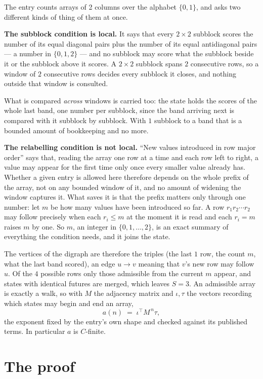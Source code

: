 \documentclass[11pt,a4paper]{article}
\theoremstyle{plain}
\theoremstyle{definition}
\begin{document}
The entry counts arrays of 2 columns over the alphabet $\{0,1\}$, and asks two different kinds of thing of them at once.

\textbf{The subblock condition is local.} It says that every $2\times2$ subblock scores the number of its equal diagonal pairs plus the number of its equal antidiagonal pairs --- a number in $\{0,1,2\}$ --- and no subblock may score what the subblock beside it or the subblock above it scores. A $ 2\times2$ subblock spans $2$ consecutive rows, so a window of $2$ consecutive rows decides every subblock it closes, and nothing outside that window is consulted.

What is compared \emph{across} windows is carried too: the state holds the scores of the whole last band, one number per subblock, since the band arriving next is compared with it subblock by subblock. With $1$ subblock to a band that is a bounded amount of bookkeeping and no more.

\textbf{The relabelling condition is not local.} ``New values introduced in row major order'' says that, reading the array one row at a time and each row left to right, a value may appear for the first time only once every smaller value already has. Whether a given entry is allowed here therefore depends on the whole prefix of the array, not on any bounded window of it, and no amount of widening the window captures it. What saves it is that the prefix matters only through one number: let $m$ be how many values have been introduced so far. A row $r_1r_2\cdots r_2$ may follow precisely when each $r_i\le m$ at the moment it is read and each $r_i=m$ raises $m$ by one. So $m$, an integer in $\{0,1,\dots,2\}$, is an exact summary of everything the condition needs, and it joins the state.

The vertices of the digraph are therefore the triples (the last $1$ row, the count $m$, what the last band scored), an edge $u\to v$ meaning that $v$'s new row may follow $u$. Of the $4$ possible rows only those admissible from the current $m$ appear, and states with identical futures are merged, which leaves $S=3$. An admissible array is exactly a walk, so with $M$ the adjacency matrix and $\iota,\tau$ the vectors recording which states may begin and end an array,
\[
a(n)\;=\;\iota^{\!\top}M^{\,n}\tau ,
\]
the exponent fixed by the entry's own shape and checked against its published terms. In
particular $a$ is $C$-finite.

\section{The proof}
\end{document}
